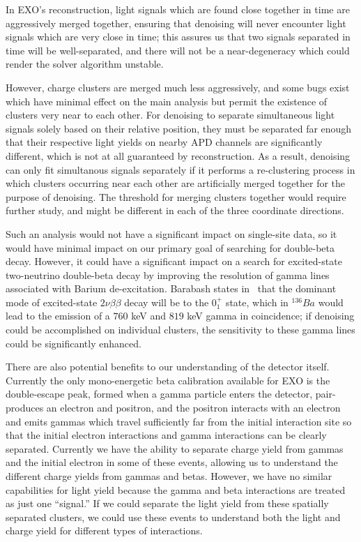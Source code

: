 In EXO's reconstruction, light signals which are found close together in time are aggressively merged together, ensuring that denoising will never encounter light signals which are very close in time; this assures us that two signals separated in time will be well-separated, and there will not be a near-degeneracy which could render the solver algorithm unstable.

However, charge clusters are merged much less aggressively, and some bugs exist which have minimal effect on the main analysis but permit the existence of clusters very near to each other.  For denoising to separate simultaneous light signals solely based on their relative position, they must be separated far enough that their respective light yields on nearby APD channels are significantly different, which is not at all guaranteed by reconstruction.  As a result, denoising can only fit simultanous signals separately if it performs a re-clustering process in which clusters occurring near each other are artificially merged together for the purpose of denoising.  The threshold for merging clusters together would require further study, and might be different in each of the three coordinate directions.

Such an analysis would not have a significant impact on single-site data, so it would have minimal impact on our primary goal of searching for double-beta decay.  However, it could have a significant impact on a search for excited-state two-neutrino double-beta decay by improving the resolution of gamma lines associated with Barium de-excitation.  Barabash states in~\cite{Barabash2010} that the dominant mode of excited-state $2\nu \beta\beta$ decay will be to the $0^{+}_1$ state, which in $^{136}Ba$ would lead to the emission of a $760$ keV and $819$ keV gamma in coincidence; if denoising could be accomplished on individual clusters, the sensitivity to these gamma lines could be significantly enhanced.

There are also potential benefits to our understanding of the detector itself.  Currently the only mono-energetic beta calibration available for EXO is the double-escape peak, formed when a gamma particle enters the detector, pair-produces an electron and positron, and the positron interacts with an electron and emits gammas which travel sufficiently far from the initial interaction site so that the initial electron interactions and gamma interactions can be clearly separated.  Currently we have the ability to separate charge yield from gammas and the initial electron in some of these events, allowing us to understand the different charge yields from gammas and betas.  However, we have no similar capabilities for light yield because the gamma and beta interactions are treated as just one ``signal.''  If we could separate the light yield from these spatially separated clusters, we could use these events to understand both the light and charge yield for different types of interactions.

